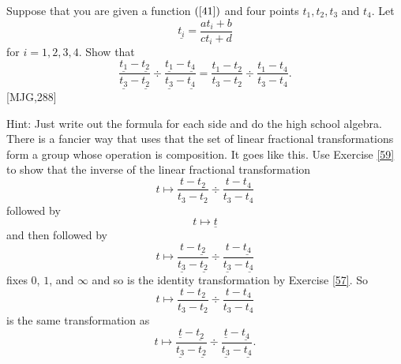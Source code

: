 \documentclass{ximera}
\begin{document}
\begin{exercise}
\label{42}Suppose that you are given a function $\left(  \ref{41}\right)  $
and four points $t_{1},t_{2},t_{3}$ and $t_{4}$. Let
\[
\underline{t_{i}}=\frac{at_{i}+b}{ct_{i}+d}%
\]
for $i=1,2,3,4$. Show that%
\[
\frac{\underline{t_{1}}-\underline{t_{2}}}{\underline{t_{3}}-\underline{t_{2}%
}}\div\frac{\underline{t_{1}}-\underline{t_{4}}}{\underline{t_{3}}%
-\underline{t_{4}}}=\frac{t_{1}-t_{2}}{t_{3}-t_{2}}\div\frac{t_{1}-t_{4}%
}{t_{3}-t_{4}}.
\]
[MJG,288]

Hint: Just write out the formula for each side and do the high school
algebra.  There is a fancier way that uses that the set of linear
fractional transformations form a group whose operation is
composition. It goes like this. Use Exercise \ref{59} to show that the
inverse of the linear fractional transformation
\[
t\mapsto\frac{t-t_{2}}{t_{3}-t_{2}}\div\frac{t-t_{4}}{t_{3}-t_{4}}%
\]
followed by%
\[
t\mapsto\underline{t}%
\]
and then followed by
\[
t\mapsto\frac{t-\underline{t_{2}}}{\underline{t_{3}}-\underline{t_{2}}}%
\div\frac{t-\underline{t_{4}}}{\underline{t_{3}}-\underline{t_{4}}}%
\]
fixes $0$, $1$, and $\infty$ and so is the identity transformation by Exercise
\ref{57}. So%
\[
t\mapsto\frac{t-t_{2}}{t_{3}-t_{2}}\div\frac{t-t_{4}}{t_{3}-t_{4}}%
\]
is the same transformation as%
\[
t\mapsto\frac{\underline{t}-\underline{t_{2}}}{\underline{t_{3}}%
-\underline{t_{2}}}\div\frac{\underline{t}-\underline{t_{4}}}{\underline
{t_{3}}-\underline{t_{4}}}.
\]
\begin{solution}
\end{solution}
\end{exercise}
\end{document}
